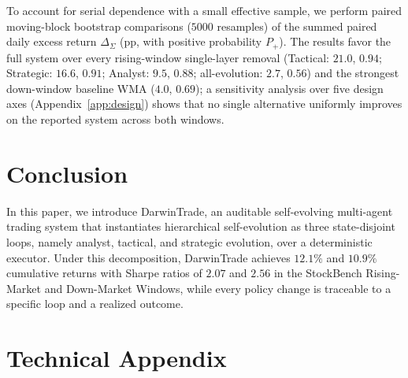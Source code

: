\documentclass[letterpaper]{article}
\begin{document}
To account for serial dependence with a small effective sample, we perform
paired moving-block bootstrap comparisons ($5000$ resamples) of the summed
paired daily excess return $\Delta_{\Sigma}$ (pp, with positive probability
$P_+$). The results favor the full system over every rising-window
single-layer removal (Tactical: $21.0$, $0.94$; Strategic: $16.6$, $0.91$;
Analyst: $9.5$, $0.88$; all-evolution: $2.7$, $0.56$) and the strongest
down-window baseline WMA ($4.0$, $0.69$); a sensitivity analysis over five
design axes (Appendix~\ref{app:design}) shows that no single alternative
uniformly improves on the reported system across both windows.

\section{Conclusion}

In this paper, we introduce DarwinTrade, an auditable self-evolving
multi-agent trading system that instantiates hierarchical self-evolution
as three state-disjoint loops, namely analyst, tactical, and strategic
evolution, over a deterministic executor. Under this decomposition,
DarwinTrade achieves $12.1\%$ and $10.9\%$ cumulative returns with
Sharpe ratios of $2.07$ and $2.56$ in the StockBench Rising-Market and
Down-Market Windows, while every policy change is traceable to a specific
loop and a realized outcome.
{\setlength{\bibsep}{2pt plus 0.2pt}
}

\clearpage
\appendix
\setcounter{secnumdepth}{2}

\section*{Technical Appendix}
\end{document}
